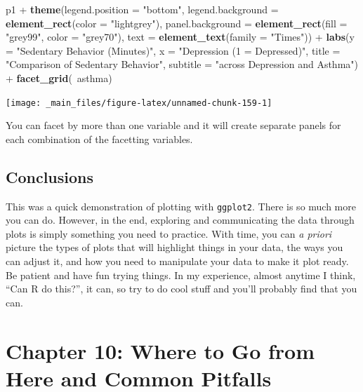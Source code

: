 \documentclass[]{tufte-book}
\newenvironment{Shaded}{}{}
\newcommand{\KeywordTok}[1]{\textcolor[rgb]{0.00,0.44,0.13}{\textbf{#1}}}
\newcommand{\DataTypeTok}[1]{\textcolor[rgb]{0.56,0.13,0.00}{#1}}
\newcommand{\StringTok}[1]{\textcolor[rgb]{0.25,0.44,0.63}{#1}}
\newcommand{\OperatorTok}[1]{\textcolor[rgb]{0.40,0.40,0.40}{#1}}
\newcommand{\NormalTok}[1]{#1}
\theoremstyle{definition}
\theoremstyle{definition}
\theoremstyle{remark}
\begin{document}
\begin{Shaded}
\begin{Highlighting}[]
\NormalTok{p1 }\OperatorTok{+}\StringTok{ }\KeywordTok{theme}\NormalTok{(}\DataTypeTok{legend.position =} \StringTok{"bottom"}\NormalTok{, }\DataTypeTok{legend.background =} \KeywordTok{element_rect}\NormalTok{(}\DataTypeTok{color =} \StringTok{"lightgrey"}\NormalTok{), }
    \DataTypeTok{panel.background =} \KeywordTok{element_rect}\NormalTok{(}\DataTypeTok{fill =} \StringTok{"grey99"}\NormalTok{, }
        \DataTypeTok{color =} \StringTok{"grey70"}\NormalTok{), }\DataTypeTok{text =} \KeywordTok{element_text}\NormalTok{(}\DataTypeTok{family =} \StringTok{"Times"}\NormalTok{)) }\OperatorTok{+}\StringTok{ }
\StringTok{    }\KeywordTok{labs}\NormalTok{(}\DataTypeTok{y =} \StringTok{"Sedentary Behavior (Minutes)"}\NormalTok{, }\DataTypeTok{x =} \StringTok{"Depression (1 = Depressed)"}\NormalTok{, }
        \DataTypeTok{title =} \StringTok{"Comparison of Sedentary Behavior"}\NormalTok{, }
        \DataTypeTok{subtitle =} \StringTok{"across Depression and Asthma"}\NormalTok{) }\OperatorTok{+}\StringTok{ }
\StringTok{    }\KeywordTok{facet_grid}\NormalTok{(}\OperatorTok{~}\NormalTok{asthma)}
\end{Highlighting}
\end{Shaded}

\texttt{[image: \_main\_files/figure-latex/unnamed-chunk-159-1]}

You can facet by more than one variable and it will create separate
panels for each combination of the facetting variables.

\section*{Conclusions}\label{conclusions-5}

This was a quick demonstration of plotting with \texttt{ggplot2}. There
is so much more you can do. However, in the end, exploring and
communicating the data through plots is simply something you need to
practice. With time, you can \emph{a priori} picture the types of plots
that will highlight things in your data, the ways you can adjust it, and
how you need to manipulate your data to make it plot ready. Be patient
and have fun trying things. In my experience, almost anytime I think,
``Can R do this?'', it can, so try to do cool stuff and you'll probably
find that you can.

\chapter*{Chapter 10: Where to Go from Here and Common
Pitfalls}\label{chapter-10-where-to-go-from-here-and-common-pitfalls}
\end{document}
